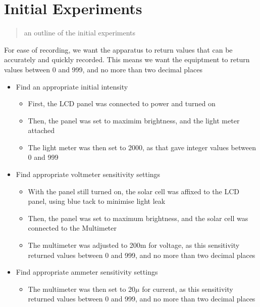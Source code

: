 \documentclass{article}
\begin{document}
\section{Initial Experiments}
\begin{quote}
an outline of the initial experiments
\end{quote}
For ease of recording, we want the apparatus to return values that can be accurately and quickly recorded. This means we want the equiptment to return values between 0 and 999, and no more than two decimal places
\begin{itemize}
  \item Find an appropriate initial intensity
  \begin{itemize}
    \item First, the LCD panel was connected to power and turned on
    \item Then, the panel was set to maximim brightness, and the light meter attached
    \item The light meter was then set to 2000, as that gave integer values between 0 and 999
  \end{itemize}
  \item Find appropriate voltmeter sensitivity settings
  \begin{itemize}
    \item With the panel still turned on, the solar cell was affixed to the LCD panel, using blue tack to minimise light leak
    \item Then, the panel was set to maximum brightness, and the solar cell was connected to the Multimeter
    \item The multimeter was adjusted to 200m for voltage, as this sensitivity returned values between 0 and 999, and no more than two decimal places
  \end{itemize}
  \item Find appropriate ammeter sensitivity settings
  \begin{itemize}
    \item The multimeter was then set to 20$\mu$ for current, as this sensitivity returned values between 0 and 999, and no more than two decimal places
  \end{itemize}
\end{itemize}
\end{document}
